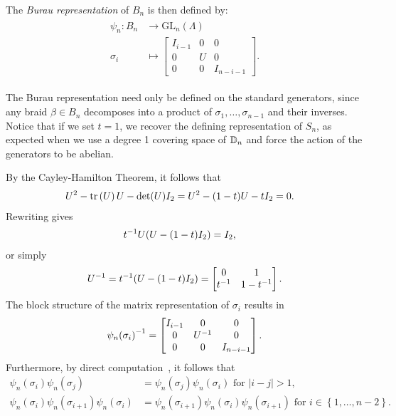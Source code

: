 The \textit{Burau representation} of $B_n$ is then defined by:
\begin{align}
    \begin{split}        
    \psi_n:B_n&\to\textrm{GL}_n(\Lambda) \\
    \sigma_i &\mapsto \begin{bmatrix}
        I_{i-1} & 0 & 0 \\
        0 & U & 0 \\
        0 & 0 & I_{n-i-1}
    \end{bmatrix}.
    \end{split}
\end{align}

The Burau representation need only be defined on the standard generators, since any braid $\beta\in B_n$ decomposes into a product of $\sigma_1,\dots,\sigma_{n-1}$ and their inverses. Notice that if we set $t = 1$, we recover the defining representation of $S_n$, as expected when we use a degree 1 covering space of $\mathbb{D}_n$ and force the action of the generators to be abelian.

By the Cayley-Hamilton Theorem, it follows that~\cite{Kassel2008}
\begin{align}
    U^2 - \textrm{tr}\left(U\right)U - \det(U)I_2 &= U^2 - (1-t)U - tI_2 = 0.
\end{align}
Rewriting gives
\begin{align}
    { t }^{-1}U(U - (1-t)I_2) &= I_2,
\end{align}
or simply
\begin{equation}
    { U }^{-1} = { t }^{-1}(U - (1-t)I_2) = \begin{bmatrix}
        0 & 1 \\ { t }^{-1} & 1-{ t }^{-1}
    \end{bmatrix}.
\end{equation}
The block structure of the matrix representation of $\sigma_i$ results in
\begin{align}
    { \psi_n(\sigma_i) }^{-1} = \begin{bmatrix}
        I_{i-1} & 0 & 0 \\
        0 & { U }^{-1} & 0 \\
        0 & 0 & I_{n-i-1}
    \end{bmatrix}.
\end{align}
Furthermore, by direct computation~\cite{Kassel2008}, it follows that
\begin{align}
    \psi_n(\sigma_i)\psi_n(\sigma_j) &= \psi_n(\sigma_j)\psi_n(\sigma_i) \textrm{ for } |i-j|>1, \\
    \psi_n(\sigma_i)\psi_n(\sigma_{i+1})\psi_n(\sigma_i) &= \psi_n(\sigma_{i+1})\psi_n(\sigma_i)\psi_n(\sigma_{i+1}) \textrm{ for } i\in\left\{ 1,\dots,n-2 \right\}.
\end{align}

